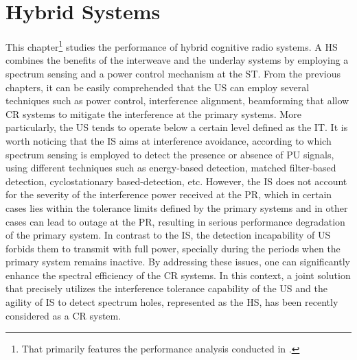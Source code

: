 \chapter{Hybrid Systems} \label{chap:HS}
This chapter\footnote{That primarily features the performance analysis conducted in .} studies the performance of hybrid cognitive radio systems. A HS combines the benefits of the interweave and the underlay systems by employing a spectrum sensing and a power control mechanism at the ST. 
From the previous chapters, it can be easily comprehended that the US can employ several techniques such as power control, interference alignment, beamforming that allow CR systems to mitigate the interference at the primary systems. More particularly, the US tends to operate below a certain level defined as the IT. 
It is worth noticing that the IS aims at interference avoidance, according to which spectrum sensing is employed to detect the presence or absence of PU signals, using different techniques such as energy-based detection, matched filter-based detection, cyclostationary based-detection, etc. %
However, the IS does not account for the severity of the interference power received at the PR, which in certain cases lies within the tolerance limits defined by the primary systems and in other cases can lead to outage at the PR, resulting in serious performance degradation of the primary system. In contrast to the IS, the detection incapability of US forbids them to transmit with full power, specially during the periods when the primary system remains inactive. By addressing these issues, one can significantly enhance the spectral efficiency of the CR systems. In this context, a joint solution that precisely utilizes the interference tolerance capability of the US and the agility of IS to detect spectrum holes, represented as the HS, has been recently considered as a CR system. 


